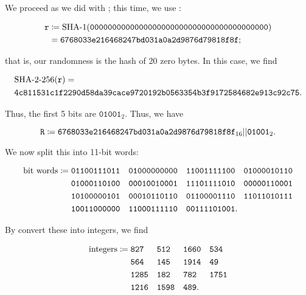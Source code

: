 \begin{example}

We proceed as we did with \MDFive{};
this time, we use \ShaOne{}:

\begin{align}
    \texttt{r} &\mathDef{} \text{\ShaOne{}}(
        \texttt{0000000000000000000000000000000000000000})
        \nonumber\\
    &= \texttt{6768033e216468247bd031a0a2d9876d79818f8f};
\end{align}

\noindent
that is, our randomness is the \ShaOne{} hash of 20 zero bytes.
In this case, we find

\begin{align}
    &\text{\ShaTwo{}-256}(\texttt{r}) = \nonumber\\
    &\texttt{4c811531c1f2290d58da39cace9720192b0563354b3f9172584682e913c92c75}.
\end{align}

\noindent
Thus, the first 5 bits are $\texttt{01001}_{2}$.
Thus, we have

\begin{equation}
    \texttt{R} \coloneqq{} \texttt{6768033e216468247bd031a0a2d9876d79818f8f}_{16}
    ||\texttt{01001}_{2}.
\end{equation}

We now split this into 11-bit words:

\begin{align}
    \text{bit words} \coloneqq{}
    &\texttt{01100111011}\quad
    \texttt{01000000000}\quad
    \texttt{11001111100}\quad
    \texttt{01000010110} \nonumber\\
    &\texttt{01000110100}\quad
    \texttt{00010010001}\quad
    \texttt{11101111010}\quad
    \texttt{00000110001} \nonumber\\
    &\texttt{10100000101}\quad
    \texttt{00010110110}\quad
    \texttt{01100001110}\quad
    \texttt{11011010111} \nonumber\\
    &\texttt{10011000000}\quad
    \texttt{11000111110}\quad
    \texttt{00111101001}.
\end{align}

\noindent
By convert these into integers, we find

\begin{align}
    \text{integers} \coloneqq{}
    &\texttt{827 }\quad
    \texttt{512 }\quad
    \texttt{1660}\quad
    \texttt{534 } \nonumber\\
    &\texttt{564 }\quad
    \texttt{145 }\quad
    \texttt{1914}\quad
    \texttt{49  } \nonumber\\
    &\texttt{1285}\quad
    \texttt{182 }\quad
    \texttt{782 }\quad
    \texttt{1751} \nonumber\\
    &\texttt{1216}\quad
    \texttt{1598}\quad
    \texttt{489}.
\end{align}


\end{example}
